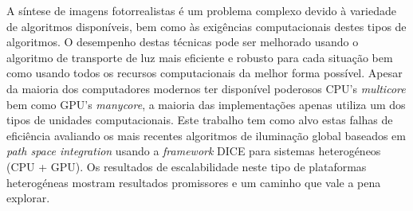 A síntese de imagens fotorrealistas é um problema complexo devido à variedade de algoritmos disponíveis, bem como às exigências computacionais destes tipos de algoritmos. O desempenho destas técnicas pode ser melhorado usando o algoritmo de transporte de luz mais eficiente e robusto para cada situação bem como usando todos os recursos computacionais da melhor forma possível. Apesar da maioria dos computadores modernos ter disponível poderosos CPU's \textit{multicore} bem como GPU's \textit{manycore}, a maioria das implementações apenas utiliza um dos tipos de unidades computacionais. Este trabalho tem como alvo estas falhas de eficiência avaliando os mais recentes algoritmos de iluminação global baseados em \textit{path space integration} usando a \textit{framework} DICE para sistemas heterogéneos (CPU + GPU). Os resultados de escalabilidade neste tipo de plataformas heterogéneas mostram resultados promissores e um caminho que vale a pena explorar.

